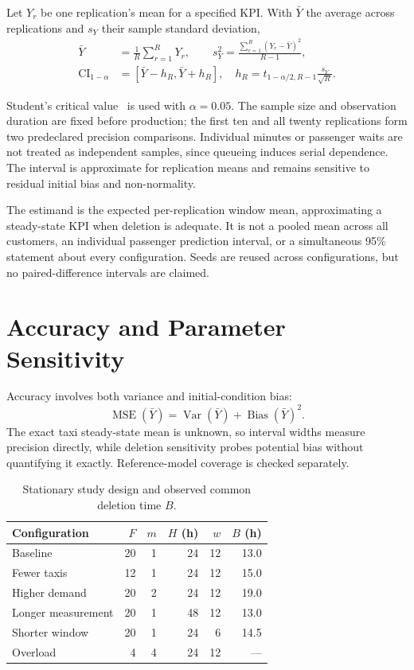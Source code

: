\documentclass[10pt,twocolumn,letterpaper]{article}
\begin{document}
\begin{samepage}
Let $Y_r$ be one replication's mean for a specified KPI. With $\bar Y$ the
average across replications and $s_Y$ their sample standard deviation,
\begin{align}
 \bar Y&=\frac1R\sum_{r=1}^R Y_r,\qquad
 s_Y^2=\frac{\sum_{r=1}^R(Y_r-\bar Y)^2}{R-1},\label{eq:repstats}\\
 \operatorname{CI}_{1-\alpha}&=\left[\bar Y-h_R,\bar Y+h_R\right],\quad
 h_R=t_{1-\alpha/2,R-1}\frac{s_Y}{\sqrt R}.\label{eq:ci}
\end{align}
\end{samepage}
Student's critical value~\cite{student} is used with $\alpha=0.05$. The sample
size and observation duration are fixed before production; the first ten and
all twenty replications form two predeclared precision comparisons. Individual
minutes or passenger waits are not treated as independent samples, since queueing
induces serial dependence. The interval is approximate for replication means
and remains sensitive to residual initial bias and non-normality.

The estimand is the expected per-replication window mean, approximating a
steady-state KPI when deletion is adequate. It is not a pooled mean across all
customers, an individual passenger prediction interval, or a simultaneous
95\% statement about every configuration. Seeds are reused across
configurations, but no paired-difference intervals are claimed.

\section{Accuracy and Parameter Sensitivity}
Accuracy involves both variance and initial-condition bias:
\begin{equation}
 \operatorname{MSE}(\bar Y)=\operatorname{Var}(\bar Y)
             +\operatorname{Bias}(\bar Y)^2.\label{eq:mse}
\end{equation}
The exact taxi steady-state mean is unknown, so interval widths measure
precision directly, while deletion sensitivity probes potential bias without
quantifying it exactly. Reference-model coverage is checked separately.

\begin{table}[tb]
\centering
\caption{Stationary study design and observed common deletion time $B$.}
\label{tab:design}
\small\setlength{\tabcolsep}{4pt}
\begin{tabular}{lrrrrr}
\toprule
Configuration & $F$ & $m$ & $H$ (h) & $w$ & $B$ (h)\\
\midrule
Baseline & 20 & 1 & 24 & 12 & 13.0\\
Fewer taxis & 12 & 1 & 24 & 12 & 15.0\\
Higher demand & 20 & 2 & 24 & 12 & 19.0\\
Longer measurement & 20 & 1 & 48 & 12 & 13.0\\
Shorter window & 20 & 1 & 24 & 6 & 14.5\\
Overload & 4 & 4 & 24 & 12 & ---\\
\bottomrule
\end{tabular}
\end{table}
\end{document}

